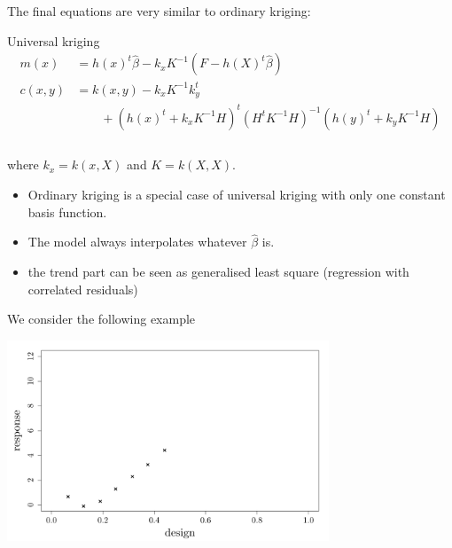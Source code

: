 \documentclass{beamer}
\begin{document}
\begin{frame}{}
The final equations are very similar to ordinary kriging:
\begin{block}{Universal kriging}
\begin{equation*}
\begin{split}
m(x) &= h(x)^t\hat{\beta} - k_x K^{-1} (F - h(X)^t\hat{\beta}) \\
c(x,y) &=  k(x,y) - k_x K^{-1} k_y^t \\
& \qquad +(h(x)^t + k_xK^{-1}H)^t(H^t K^{-1} H)^{-1}(h(y)^t + k_yK^{-1}H) \\
\end{split}
\end{equation*} 
\\ \vspace{3mm}
where $k_x = k(x,X)$ and $K = k(X,X)$.
\end{block}
\end{frame}

\begin{frame}{}
\begin{itemize}
	\item Ordinary kriging is a special case of universal kriging with only one constant basis function.
	\item The model always interpolates whatever $\hat{\beta}$ is.
	\item the trend part can be seen as generalised least square (regression with correlated residuals)
\end{itemize}
\end{frame}

\begin{frame}{}
We consider the following example
\begin{center}
	\includegraphics[height=6cm]{figures/R/trend_data}
\end{center}
\end{frame}
\end{document}
